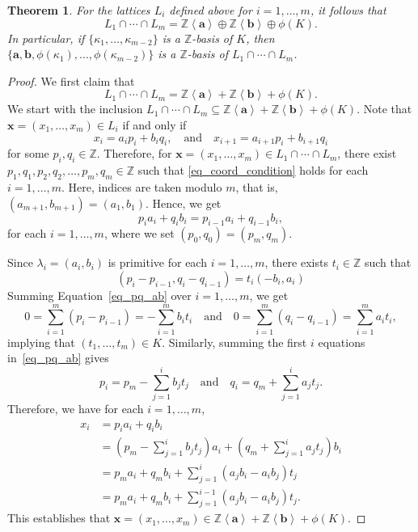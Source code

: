 \documentclass[10pt,a4paper]{amsart}
\newtheorem{theorem}{Theorem}
\newcommand{\ZZ}{\mathbb{Z}}
\begin{document}
\begin{theorem}\label{thm_main_lattice_intersection}
For the lattices $L_i$ defined above for $i=1, \dots, m$,  it follows that 
\[
L_1\cap \cdots \cap L_m = \mathbb{Z}\left<\mathbf{a}\right> \oplus \mathbb{Z}\left<\mathbf{b}\right>\oplus \phi(K).
\]
In particular, if $\{\kappa_1, \dots, \kappa_{m-2}\}$ is a $\mathbb{Z}$-basis of $K$, then
$\{ \mathbf{a}, \mathbf{b}, \phi(\kappa_1), \dots,  \phi(\kappa_{m-2})\}$
is a $\mathbb{Z}$-basis of $L_1\cap\cdots\cap L_m$.
\end{theorem}

\begin{proof}
We first claim that 
\begin{equation}\label{eq_int_equal_sum}
L_1\cap \cdots \cap L_m=\mathbb{Z}\left<\mathbf{a}\right> + \mathbb{Z}\left<\mathbf{b}\right>+ \phi(K).
\end{equation}
We start with the inclusion  $L_1\cap \cdots \cap L_m\subseteq\mathbb{Z}\left<\mathbf{a}\right> + \mathbb{Z}\left<\mathbf{b}\right>+ \phi(K)$.
Note that $\mathbf{x}=(x_1, \dots, x_m)\in L_i$ if and only if 
\begin{equation}\label{eq_coord_condition}
x_i=a_ip_i+b_iq_i,\quad \text{and} \quad x_{i+1}=a_{i+1}p_i+b_{i+1}q_i
\end{equation}
for some $p_i, q_i\in \ZZ$. Therefore, for $\mathbf{x}=(x_1, \dots, x_m)\in L_1\cap\cdots \cap L_m$, there exist
$p_1, q_1, p_2, q_2, \dots, p_m, q_m\in \ZZ$ 
such that \eqref{eq_coord_condition} holds for each $i=1, \dots, m$. Here, indices are taken modulo $m$, that is, $(a_{m+1}, b_{m+1})=(a_1, b_1)$. Hence, we get 
\[
p_ia_i+q_ib_i= p_{i-1}a_i + q_{i-1}b_i,
\]
for each $i=1, \dots, m$, where we set $(p_0, q_0)=(p_m, q_m)$. 

Since $\lambda_i=(a_i, b_i)$ is primitive for each $i=1,\ldots,m$, there exists $t_i\in\ZZ$ such that
\begin{equation}\label{eq_pq_ab}
(p_i-p_{i-1}, q_i- q_{i-1}) = t_i (-b_i, a_i)
\end{equation}
Summing Equation~\eqref{eq_pq_ab} over $i=1, \dots, m$, we get 
\[
0=\sum_{i=1}^m (p_i-p_{i-1})  = - \sum_{i=1}^m b_it_i \quad \text{and} \quad 
0=\sum_{i=1}^m (q_i-q_{i-1})  =  \sum_{i=1}^m a_it_i,
\]
implying that $(t_1, \dots, t_m)\in K$. 
Similarly, summing the first $i$ equations in~\eqref{eq_pq_ab} gives
\[
p_i=p_m - \sum_{j=1}^i b_jt_j \quad \text{and} \quad q_i=q_m + \sum_{j=1}^i a_jt_j.
\]
Therefore, we have for each $i=1, \dots, m$,
\begin{align*}
x_i&=p_ia_i+q_ib_i\\
&=\left(p_m - \sum_{j=1}^i b_jt_j\right) a_i + \left( q_m + \sum_{j=1}^i a_jt_j \right) b_i \\
&=p_ma_i+q_mb_i + \sum_{j=1}^i (a_jb_i - a_ib_j) t_j\\
&= p_ma_i+q_mb_i + \sum_{j=1}^{i-1} (a_jb_i - a_ib_j) t_j.
\end{align*}
This establishes that $\mathbf{x}=(x_1, \dots, x_m)\in \mathbb{Z}\left<\mathbf{a}\right> + \mathbb{Z}\left<\mathbf{b}\right>+ \phi(K)$. 


\end{proof}
\end{document}
